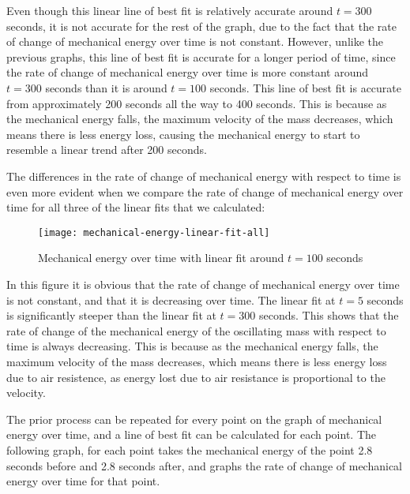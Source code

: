 \documentclass[titlepage]{article}
\begin{document}
            Even though this linear line of best fit is relatively accurate around $t=300$ seconds, it is not accurate for the rest of the graph, due to the fact that the rate of change of mechanical energy over time is not constant.
            However, unlike the previous graphs, this line of best fit is accurate for a longer period of time, since the rate of change of mechanical energy over time is more constant around $t=300$ seconds than it is around $t=100$ seconds.
            This line of best fit is accurate from approximately 200 seconds all the way to 400 seconds.
            This is because as the mechanical energy falls, the maximum velocity of the mass decreases, which means there is less energy loss, causing the mechanical energy to start to resemble a linear trend after 200 seconds.
            
            The differences in the rate of change of mechanical energy with respect to time is even more evident when we compare the rate of change of mechanical energy over time for all three of the linear fits that we calculated:
            
            \begin{figure}[H]
                \centering
                \texttt{[image: mechanical-energy-linear-fit-all]}
                \caption{Mechanical energy over time with linear fit around $t=100$ seconds}
                \label{fig:mechanical-energy-linear-fit-all}
            \end{figure}
            
            In this figure it is obvious that the rate of change of mechanical energy over time is not constant, and that it is decreasing over time.
            The linear fit at $t=5$ seconds is significantly steeper than the linear fit at $t=300$ seconds.
            This shows that the rate of change of the mechanical energy of the oscillating mass with respect to time is always decreasing.
            This is because as the mechanical energy falls, the maximum velocity of the mass decreases, which means there is less energy loss due to air resistence, as energy lost due to air resistance is proportional to the velocity.
            
            The prior process can be repeated for every point on the graph of mechanical energy over time, and a line of best fit can be calculated for each point.
            The following graph, for each point takes the mechanical energy of the point 2.8 seconds before and 2.8 seconds after, and graphs the rate of change of mechanical energy over time for that point.
            
\end{document}
